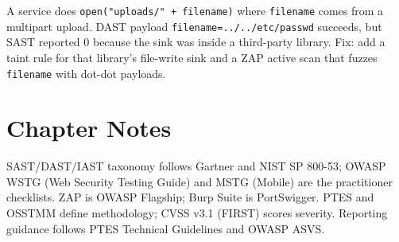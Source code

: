 \begin{example}
A service does \texttt{open("uploads/" + filename)} where \texttt{filename} comes from a multipart upload. DAST payload \texttt{filename=../../etc/passwd} succeeds, but SAST reported 0 because the sink was inside a third-party library. Fix: add a taint rule for that library's file-write sink and a ZAP active scan that fuzzes \texttt{filename} with dot-dot payloads.
\end{example}

\section*{Chapter Notes}
SAST/DAST/IAST taxonomy follows Gartner and NIST SP 800-53; OWASP WSTG (Web Security Testing Guide) and MSTG (Mobile) are the practitioner checklists. ZAP is OWASP Flagship; Burp Suite is PortSwigger. PTES and OSSTMM define methodology; CVSS v3.1 (FIRST) scores severity. Reporting guidance follows PTES Technical Guidelines and OWASP ASVS.

